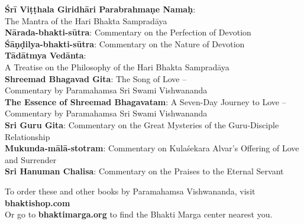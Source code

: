 \documentclass[12pt, twoside, openright]{memoir}
\begin{document}
\begin{flushleft}

\textbf{Śrī Viṭṭhala Giridhāri Parabrahmaṇe Namaḥ}: \\
The Mantra of the Hari Bhakta Sampradāya\\[1em]

\textbf{Nārada-bhakti-sūtra}: Commentary on the Perfection 
of Devotion \\[1em]

\textbf{Śāṇḍilya-bhakti-sūtra}: Commentary on the Nature 
of Devotion \\[1em]

\textbf{Tādātmya Vedānta}: \\
A Treatise on the Philosophy of the Hari Bhakta Sampradāya\\[1em]

\textbf{Shreemad Bhagavad Gita}: The Song of Love – \\
Commentary by Paramahamsa Sri Swami Vishwananda \\[1em]

\textbf{The Essence of Shreemad Bhagavatam}: A Seven-Day
Journey to Love – Commentary by Paramahamsa Sri Swami Vishwananda \\[1em]

\textbf{Sri Guru Gita}: Commentary on the Great Mysteries
of the Guru-Disciple Relationship \\[1em]

\textbf{Mukunda-mālā-stotram}: Commentary on Kulaśekara
Alvar’s Offering of Love and Surrender \\[1em]

\textbf{Sri Hanuman Chalisa}: Commentary on the Praises 
to the Eternal Servant \\[1em]

\bigskip
\bigskip

To order these and other books by Paramahamsa
Vishwananda, visit \textbf{bhaktishop.com} \\[1em]

\bigskip
Or go to \textbf{bhaktimarga.org} to find the Bhakti Marga
center nearest you.
\end{flushleft}


 
\end{document}
